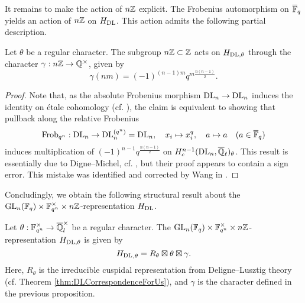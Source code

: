 \documentclass[../main.tex]{subfiles}
\begin{document}
It remains to make the action of $n\mathbb{Z}$ explicit. The Frobenius automorphism on
$\overline {\mathbb{F}}_q$ yields an action of $n\mathbb{Z}$ on $\hH_\DL$. This action admits the
following partial description.

\begin{prop}
  Let $\theta$ be a regular character. The subgroup $n\mathbb{Z} \subset \mathbb{Z}$ acts on
  $H_{\mathrm{DL},\theta}$ through the character $\gamma:
  n\mathbb{Z} \to \mathbb{Q}^\times$, given by
  $$\gamma(nm) =  (-1)^{(n-1)m} q^{m \frac{n(n-1)}2}.$$
  \begin{proof}
    Note that, as the absolute Frobenius morphism $\mathrm{DL}_n \to \mathrm{DL}_n$
    induces the identity on \'etale cohomology (cf.
    \cite[\href{https://stacks.math.columbia.edu/tag/03SN}{Tag
    03SN}]{stacks-project}), the claim is equivalent to showing that pullback 
    along the relative Frobenius 
    \begin{equation*}
      \mathrm{Frob}_{q^n}: \mathrm{DL}_n \to \mathrm{DL}_n^{(q^n)} = \mathrm{DL}_n, \quad
      x_i \mapsto x_i^q,\quad a \mapsto a \quad (a \in \overline {\mathbb{F}}_q)
    \end{equation*}
    induces multiplication of $(-1)^{n-1}q^{\frac{n(n-1)}2}$
    on $H^{n-1}_c(\mathrm{DL}_n, \overline {\mathbb{Q}}_\ell)_\theta$. 
    This result is essentially due to Digne--Michel, cf. \cite[Remarque
    3.14]{digne1985fonctions}, but their proof appears to contain a sign error.
    This mistake was identified and corrected by Wang in \cite[Théorème
    3.1.12]{wang2014espace}.
  \end{proof}
\end{prop}

Concludingly, we obtain the following structural result about the 
$\operatorname{GL}_n(\mathbb{F}_q) \times \mathbb{F}_{q^n}^\times \times n\mathbb{Z}$-representation 
$\hH_\DL$.

\begin{thm}[Structure of $\hH_\DL$]\label{thm:MainThmHDlStructure}
  Let $\theta: \mathbb{F}_{q^n}^\times \to \overline {\mathbb{Q}}_l^\times$ be a regular character.  
  The $\operatorname{GL}_n(\mathbb{F}_q) \times \mathbb{F}_{q^n}^\times \times n\mathbb{Z}$-representation
  $H_{\mathrm{DL}, \theta}$ is given by 
  \begin{equation*}
    {H_\mathrm{DL}}_{,\theta} = R_\theta \boxtimes \theta \boxtimes \gamma.
  \end{equation*}
  Here, $R_\theta$ is the irreducible cuspidal representation from
  Deligne--Lusztig theory (cf. Theorem \ref{thm:DLCorrespondenceForUs}), and
  $\gamma$ is the character defined in the previous proposition.
\end{thm}

\end{document}
